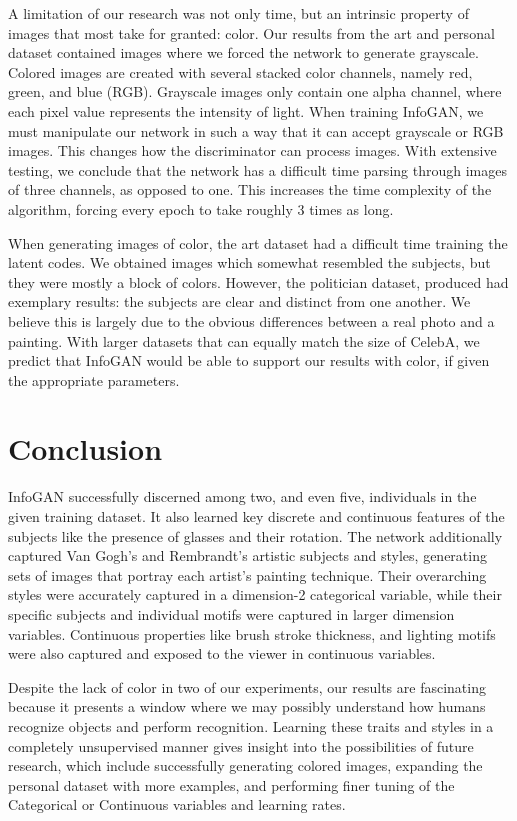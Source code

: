 \documentclass[conference,11pt]{IEEEtran}
\begin{document}
A limitation of our research was not only time, but an intrinsic property of images that most take for granted: color.  Our results from the art and personal dataset contained images where we forced the network to generate grayscale.  Colored images are created with several stacked color channels, namely red, green, and blue (RGB).  Grayscale images only contain one alpha channel, where each pixel value represents the intensity of light.  When training InfoGAN, we must manipulate our network in such a way that it can accept grayscale or RGB images.  This changes how the  discriminator can process images.  With extensive testing, we conclude that the network has a difficult time parsing through images of three channels, as opposed to one.  This increases the time complexity of the algorithm, forcing every epoch to take roughly 3 times as long.

When generating images of color, the art dataset had a difficult time training the latent codes.  We obtained images which somewhat resembled the subjects, but they were mostly a block of colors.  However, the politician dataset, produced had exemplary results: the subjects are clear and distinct from one another.  We believe this is largely due to the obvious differences between a real photo and a painting.  With larger datasets that can equally match the size of CelebA, we predict that InfoGAN would be able to support our results with color, if given the appropriate parameters. 

\section{Conclusion}

InfoGAN successfully discerned among two, and even five, individuals in the given training dataset.  It also learned key discrete and continuous features of the subjects like the presence of glasses and their rotation.  The network additionally captured Van Gogh's and Rembrandt's artistic subjects and styles, generating sets of images that portray each artist's painting technique.  Their overarching styles were accurately captured in a dimension-2 categorical variable, while their specific subjects and individual motifs were captured in larger dimension variables.  Continuous properties like brush stroke thickness, and lighting motifs were also captured and exposed to the viewer in continuous variables. 

Despite the lack of color in two of our experiments, our results are fascinating because it presents a window where we may possibly understand how humans recognize objects and perform recognition.  Learning these traits and styles in a completely unsupervised manner gives insight into the possibilities of future research, which include successfully generating colored images, expanding the personal dataset with more examples, and performing finer tuning of the Categorical or Continuous variables and learning rates.
\end{document}
